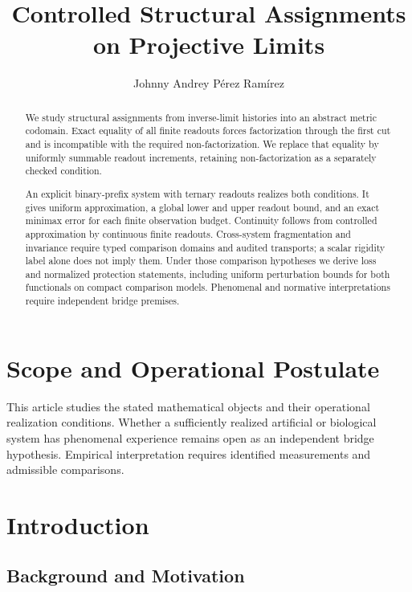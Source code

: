 \documentclass[11pt,a4paper]{article}
\title{\textbf{Controlled Structural Assignments on Projective Limits}}
\author{Johnny Andrey P\'{e}rez Ram\'{i}rez}
\date{}
\theoremstyle{plain}
\theoremstyle{definition}
\theoremstyle{remark}
\begin{document}
\setlength{\emergencystretch}{3em}
\maketitle

\begin{abstract}
We study structural assignments from inverse-limit histories into an abstract metric codomain. Exact equality of all finite readouts forces factorization through the first cut and is incompatible with the required non-factorization. We replace that equality by uniformly summable readout increments, retaining non-factorization as a separately checked condition.

An explicit binary-prefix system with ternary readouts realizes both conditions. It gives uniform approximation, a global lower and upper readout bound, and an exact minimax error for each finite observation budget. Continuity follows from controlled approximation by continuous finite readouts. Cross-system fragmentation and invariance require typed comparison domains and audited transports; a scalar rigidity label alone does not imply them. Under those comparison hypotheses we derive loss and normalized protection statements, including uniform perturbation bounds for both functionals on compact comparison models. Phenomenal and normative interpretations require independent bridge premises.
\end{abstract}

\section*{Scope and Operational Postulate}
This article studies the stated mathematical objects and their operational
realization conditions. Whether a sufficiently realized artificial or biological
system has phenomenal experience remains open as an independent bridge
hypothesis. Empirical interpretation requires identified measurements and
admissible comparisons.

\section{Introduction}

\subsection{Background and Motivation}
\end{document}
